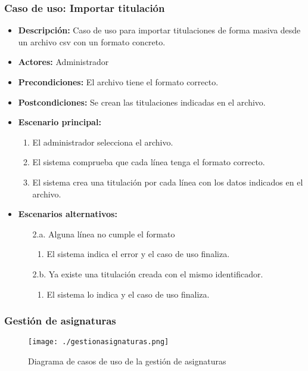 \subsubsection*{Caso de uso: Importar titulación}
\begin{itemize}
\item{\bf Descripción:} Caso de uso para importar titulaciones de forma masiva desde un archivo csv con un formato concreto.
\item{\bf Actores:} Administrador
\item{\bf Precondiciones:} El archivo tiene el formato correcto.
\item{\bf Postcondiciones:} Se crean las titulaciones indicadas en el archivo.
\item{\bf Escenario principal:}
	\begin{enumerate}
	\item El administrador selecciona el archivo.
	\item El sistema comprueba que cada línea tenga el formato correcto.
	\item El sistema crea una titulación por cada línea con los datos indicados en el archivo.
	\end{enumerate}
\item{\bf Escenarios alternativos:}
	\begin{itemize}
		\item[2.a.] Alguna línea no cumple el formato
		\begin{enumerate}
			\item El sistema indica el error y el caso de uso finaliza.
		\end{enumerate}
		\item[2.b.] Ya existe una titulación creada con el mismo identificador.
		\begin{enumerate}
			\item El sistema lo indica y el caso de uso finaliza.
		\end{enumerate}
	\end{itemize}
\end{itemize}



\subsubsection{Gestión de asignaturas}
\begin{figure}[H] 
  \label{gestion-asignaturas} 
	\begin{center}
    \texttt{[image: ./gestionasignaturas.png]}
  \end{center}
\caption{Diagrama de casos de uso de la gestión de asignaturas}
\end{figure}
